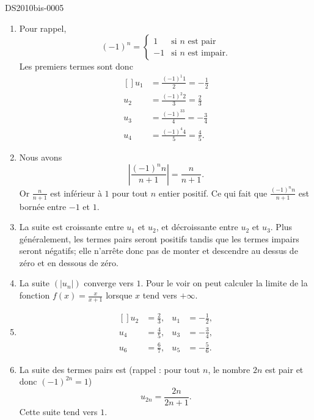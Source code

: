 
\begin{corrige}{DS2010bis-0005}


	\begin{enumerate}
		\item
			Pour rappel, 
			\begin{equation}
				(-1)^n=\begin{cases}
					1	&	\text{si $n$ est pair}\\
					-1	&	 \text{si $n$ est impair.}
				\end{cases}
			\end{equation}
			Les premiers termes sont donc
			\begin{equation}
				\begin{aligned}[]
					u_1&=\frac{(-1)^1 1 }{2}=-\frac{ 1 }{2}\\
					u_2&=\frac{(-1)^2 2 }{3}=\frac{ 2 }{ 3 }\\
					u_3&=\frac{(-1)^33}{ 4 }=-\frac{ 3 }{ 4 }\\
					u_4&=\frac{(-1)^4 4}{ 5 }=\frac{ 4 }{ 5 }.
				\end{aligned}
			\end{equation}
		\item
			Nous avons
			\begin{equation}
				\left| \frac{(-1)^nn}{ n+1 } \right|=\frac{n}{ n+1 }.
			\end{equation}
			Or $\frac{n}{ n+1 }$ est inférieur à $1$ pour tout $n$ entier positif. Ce qui fait que $\frac{(-1)^nn}{ n+1 }$ est bornée entre $-1$ et $1$. 
		\item
			La suite est croissante entre $u_1$ et $u_2$, et décroissante entre $u_2$ et $u_3$. Plus généralement, les termes pairs seront positifs tandis que les termes impairs seront négatifs; elle n'arrête donc pas de monter et descendre au dessus de zéro et en dessous de zéro.
		\item
			La suite $(| u_n |)$ converge vers $1$. Pour le voir on peut calculer la limite de la fonction $f(x)=\frac{x}{ x+1 }$ lorsque $x$ tend vers $+\infty$.  
		\item
			\begin{equation}
				\begin{aligned}[]
					u_2&=\frac{ 2 }{3},	&u_1&=-\frac{1}{2},\\
					u_4&=\frac{ 4 }{5},	&u_3&=-\frac{ 3 }{ 4 },\\
					u_6&=\frac{ 6 }{7},	&u_5&=-\frac{ 5 }{ 6 }.
				\end{aligned}
			\end{equation}
		\item
			La suite des termes pairs est (rappel : pour tout $n$, le nombre $2n$ est pair et donc $(-1)^{2n}=1$)
			\begin{equation}
				u_{2n}=\frac{2n}{ 2n+1 }.
			\end{equation}
			Cette suite tend vers $1$.


\end{enumerate}
\end{corrige}
